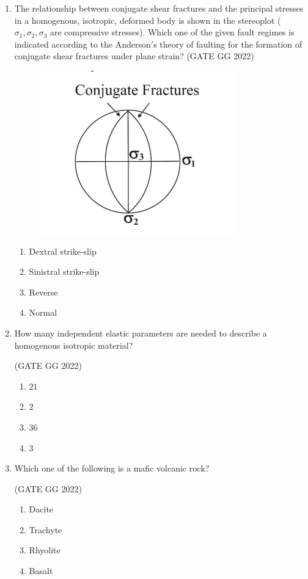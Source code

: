 \documentclass[journal]{IEEEtran}
\begin{document}
\begin{enumerate}[start=1]
\item The relationship between conjugate shear fractures and the principal stresses in a homogenous, isotropic, deformed body is shown in the stereoplot 
($\sigma_1, \sigma_2, \sigma_3$ are compressive stresses).  Which one of the given fault regimes is indicated according to the Anderson$'$s theory of faulting for the formation of conjugate shear fractures under plane strain?
\hfill(GATE GG 2022)
\begin{figure}[H]
\centering
\includegraphics[width = 0.42\columnwidth]{figs/07.png}
\caption*{}
\label{fig:q5}
\end{figure}
\begin{multicols}{2}
\begin{enumerate}
\item Dextral strike-slip
\item Sinistral strike-slip
\item Reverse
\item Normal
\end{enumerate}
\end{multicols}

\item How many independent elastic parameters are needed to describe a homogenous isotropic material?

\hfill(GATE GG 2022)
\begin{enumerate}
\item $21$
\item $2$
\item $36$
\item $3$
\end{enumerate}

\item Which one of the following is a mafic volcanic rock?

\hfill(GATE GG 2022)
\begin{enumerate}
\item Dacite
\item Trachyte
\item Rhyolite
\item Basalt
\end{enumerate}


\end{enumerate}
\end{document}
